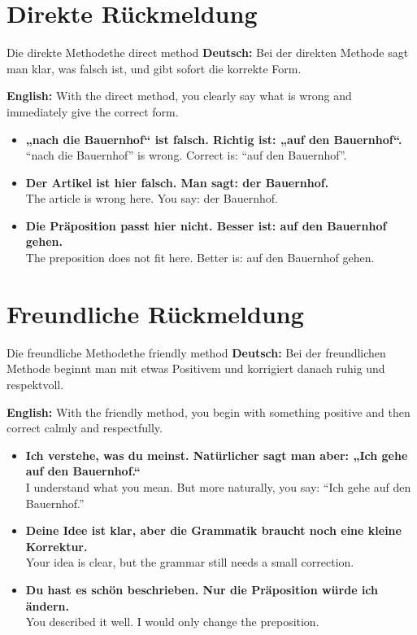 \documentclass[a4paper,11pt]{article}
\newcommand{\GermanText}[1]{\textbf{Deutsch: }#1\par}
\newcommand{\EnglishText}[1]{{\small\color{SoftGray}\textbf{English: }#1\par}}
\newcommand{\ExampleItem}[2]{\item \textbf{#1}\\{\small\color{SoftGray}#2}}
\begin{document}
    
    \section{Direkte Rückmeldung}
        
        \begin{grammarentry}{Die direkte Methode}{the direct method}
            \GermanText{Bei der direkten Methode sagt man klar, was falsch ist, und gibt sofort die korrekte Form.}
            \EnglishText{With the direct method, you clearly say what is wrong and immediately give the correct form.}
            
            \begin{exbox}
                \begin{itemize}
                    \ExampleItem{„nach die Bauernhof“ ist falsch. Richtig ist: „auf den Bauernhof“.}{“nach die Bauernhof” is wrong. Correct is: “auf den Bauernhof”.}
                    \ExampleItem{Der Artikel ist hier falsch. Man sagt: der Bauernhof.}{The article is wrong here. You say: der Bauernhof.}
                    \ExampleItem{Die Präposition passt hier nicht. Besser ist: auf den Bauernhof gehen.}{The preposition does not fit here. Better is: auf den Bauernhof gehen.}
                \end{itemize}
            \end{exbox}
        \end{grammarentry}
    
    
    \section{Freundliche Rückmeldung}
        
        \begin{grammarentry}{Die freundliche Methode}{the friendly method}
            \GermanText{Bei der freundlichen Methode beginnt man mit etwas Positivem und korrigiert danach ruhig und respektvoll.}
            \EnglishText{With the friendly method, you begin with something positive and then correct calmly and respectfully.}
            
            \begin{exbox}
                \begin{itemize}
                    \ExampleItem{Ich verstehe, was du meinst. Natürlicher sagt man aber: „Ich gehe auf den Bauernhof.“}{I understand what you mean. But more naturally, you say: “Ich gehe auf den Bauernhof.”}
                    \ExampleItem{Deine Idee ist klar, aber die Grammatik braucht noch eine kleine Korrektur.}{Your idea is clear, but the grammar still needs a small correction.}
                    \ExampleItem{Du hast es schön beschrieben. Nur die Präposition würde ich ändern.}{You described it well. I would only change the preposition.}
                \end{itemize}
            \end{exbox}
        \end{grammarentry}
    
\end{document}
